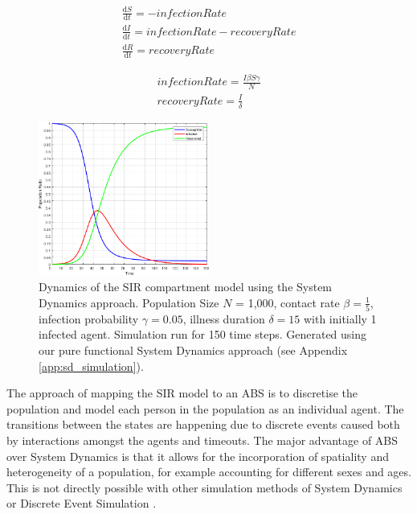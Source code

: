 \begin{equation}
\begin{aligned}
\frac{\mathrm d S}{\mathrm d t} = -infectionRate \\
\frac{\mathrm d I}{\mathrm d t} = infectionRate - recoveryRate \\
\frac{\mathrm d R}{\mathrm d t} = recoveryRate 
\end{aligned}
\end{equation}

\begin{equation}
\begin{aligned}
infectionRate = \frac{I \beta S \gamma}{N} \\
recoveryRate = \frac{I}{\delta} 
\end{aligned}
\end{equation}

\begin{figure}
	\centering
	\includegraphics[width=0.5\textwidth, angle=0]{./fig/timedriven/SIR_SD_1000agents_150t_001dt.png}
	\caption[Dynamics of the SIR compartment model using the System Dynamics approach]{Dynamics of the SIR compartment model using the System Dynamics approach. Population Size $N$ = 1,000, contact rate $\beta =  \frac{1}{5}$, infection probability $\gamma = 0.05$, illness duration $\delta = 15$ with initially 1 infected agent. Simulation run for 150 time steps. Generated using our pure functional System Dynamics approach (see Appendix \ref{app:sd_simulation}).}
	\label{fig:sir_sd_dynamics}
\end{figure}

The approach of mapping the SIR model to an ABS is to discretise the population and model each person in the population as an individual agent. The transitions between the states are happening due to discrete events caused both by interactions amongst the agents and timeouts. The major advantage of ABS over System Dynamics is that it allows for the incorporation of spatiality and heterogeneity of a population, for example accounting for different sexes and ages. This is not directly possible with other simulation methods of System Dynamics or Discrete Event Simulation \cite{zeigler_theory_2000}.


